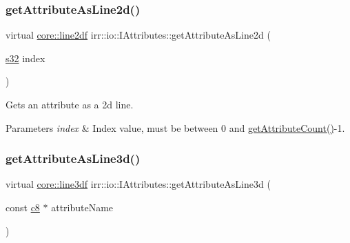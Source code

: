 \subsubsection{\texorpdfstring{get\+Attribute\+As\+Line2d()}{getAttributeAsLine2d()}\hspace{0.1cm}{\footnotesize\ttfamily [4/4]}}
{\footnotesize\ttfamily virtual \hyperlink{namespaceirr_1_1core_aeb733b0cceca2d174bf42ad477566204}{core\+::line2df} irr\+::io\+::\+I\+Attributes\+::get\+Attribute\+As\+Line2d (\begin{DoxyParamCaption}\item[{\hyperlink{namespaceirr_ac66849b7a6ed16e30ebede579f9b47c6}{s32}}]{index }\end{DoxyParamCaption})\hspace{0.3cm}{\ttfamily [pure virtual]}}



Gets an attribute as a 2d line. 


\begin{DoxyParams}{Parameters}
{\em index} & Index value, must be between 0 and \hyperlink{classirr_1_1io_1_1IAttributes_a796bdd9440ee7ba0b6742a90a82870b6}{get\+Attribute\+Count()}-\/1. \\
\hline
\end{DoxyParams}
\mbox{\label{classirr_1_1io_1_1IAttributes_ab6da415d43f2a4211026b191b17b0938}} 
\subsubsection{\texorpdfstring{get\+Attribute\+As\+Line3d()}{getAttributeAsLine3d()}\hspace{0.1cm}{\footnotesize\ttfamily [1/4]}}
{\footnotesize\ttfamily virtual \hyperlink{namespaceirr_1_1core_acadb288f9aca3bf2d1222abcdf77114e}{core\+::line3df} irr\+::io\+::\+I\+Attributes\+::get\+Attribute\+As\+Line3d (\begin{DoxyParamCaption}\item[{const \hyperlink{namespaceirr_a9395eaea339bcb546b319e9c96bf7410}{c8} $\ast$}]{attribute\+Name }\end{DoxyParamCaption})\hspace{0.3cm}{\ttfamily [pure virtual]}}



